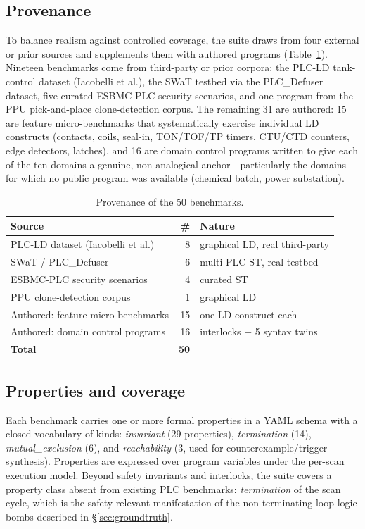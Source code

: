 \subsection{Provenance}
To balance realism against controlled coverage, the suite draws from four external
or prior sources and supplements them with authored programs
(Table~\ref{tab:provenance}). Nineteen benchmarks come from third-party or prior
corpora: the PLC-LD tank-control dataset (Iacobelli et al.), the SWaT testbed via the
PLC\_Defuser dataset, five curated ESBMC-PLC security scenarios, and one program from
the PPU pick-and-place clone-detection corpus. The remaining 31 are authored: 15 are
feature micro-benchmarks that systematically exercise individual LD constructs
(contacts, coils, seal-in, TON/TOF/TP timers, CTU/CTD counters, edge detectors,
latches), and 16 are domain control programs written to give each of the ten domains a
genuine, non-analogical anchor---particularly the domains for which no public program
was available (chemical batch, power substation).

\begin{table}[t]
  \centering\small
  \caption{Provenance of the 50 benchmarks.}
  \label{tab:provenance}
  \begin{tabular}{@{}lr l@{}}
    \toprule
    \textbf{Source} & \textbf{\#} & \textbf{Nature}\\
    \midrule
    PLC-LD dataset (Iacobelli et al.) & 8  & graphical LD, real third-party\\
    SWaT / PLC\_Defuser               & 6  & multi-PLC ST, real testbed\\
    ESBMC-PLC security scenarios      & 4  & curated ST\\
    PPU clone-detection corpus        & 1  & graphical LD\\
    Authored: feature micro-benchmarks& 15 & one LD construct each\\
    Authored: domain control programs & 16 & interlocks + 5 syntax twins\\
    \midrule
    \textbf{Total}                    & \textbf{50} & \\
    \bottomrule
  \end{tabular}
\end{table}

\subsection{Properties and coverage}
Each benchmark carries one or more formal properties in a YAML schema with a closed
vocabulary of kinds: \emph{invariant} (29 properties), \emph{termination}
(14), \emph{mutual\_exclusion} (6), and \emph{reachability} (3, used for
counterexample/trigger synthesis). Properties are expressed over program variables
under the per-scan execution model. Beyond safety invariants and interlocks, the suite
covers a property class absent from existing PLC benchmarks: \emph{termination} of the
scan cycle, which is the safety-relevant manifestation of the non-terminating-loop
logic bombs described in \S\ref{sec:groundtruth}.

